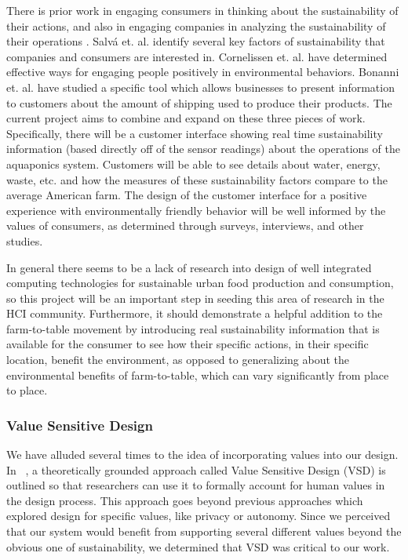 \documentclass{sigchi}
\begin{document}
There is prior work \cite{smallBusiness, cueing} in engaging consumers in thinking about the sustainability of their actions, and also in engaging companies in analyzing the sustainability of their operations \cite{smallBusiness, audit}. Salv\'a et. al. identify several key factors of sustainability that companies and consumers are interested in. Cornelissen et. al. have determined effective ways for engaging people positively in environmental behaviors. Bonanni et. al. have studied a specific tool which allows businesses to present information to customers about the amount of shipping used to produce their products. The current project aims to combine and expand on these three pieces of work. Specifically, there will be a customer interface showing real time sustainability information (based directly off of the sensor readings) about the operations of the aquaponics system. Customers will be able to see details about water, energy, waste, etc. and how the measures of these sustainability factors compare to the average American farm. The design of the customer interface for a positive experience with environmentally friendly behavior will be well informed by the values of consumers, as determined through surveys, interviews, and other studies. 

In general there seems to be a lack of research into design of well integrated computing technologies for sustainable urban food production and consumption, so this project will be an important step in seeding this area of research in the HCI community. Furthermore, it should demonstrate a helpful addition to the farm-to-table movement by introducing real sustainability information that is available for the consumer to see how their specific actions, in their specific location, benefit the environment, as opposed to generalizing about the environmental benefits of farm-to-table, which can vary significantly from place to place.

\subsubsection{Value Sensitive Design}
We have alluded several times to the idea of incorporating values into our design. In ~\cite{VSD}, a theoretically grounded approach called Value Sensitive Design (VSD) is outlined so that researchers can use it to formally account for human values in the design process. This approach goes beyond previous approaches which explored design for specific values, like privacy or autonomy. Since we perceived that our system would benefit from supporting several  different values beyond the obvious one of sustainability, we determined that VSD was critical to our work. 
\end{document}
